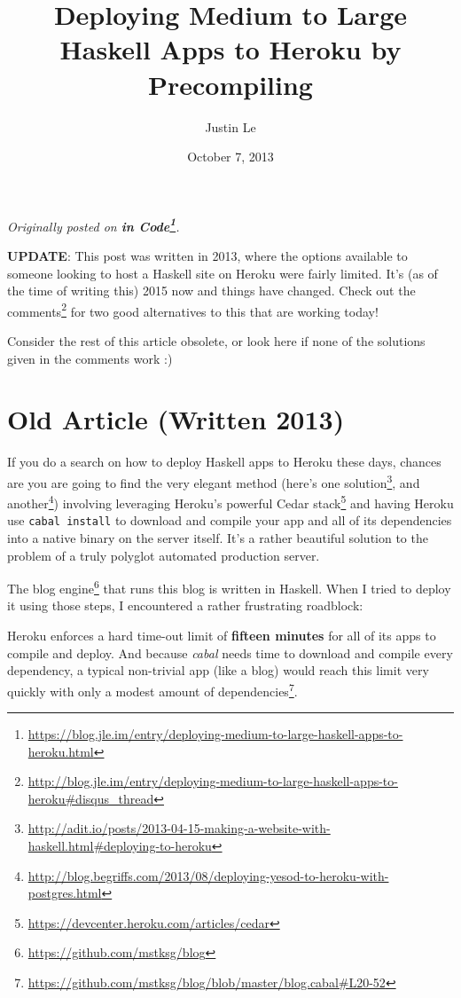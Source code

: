 \documentclass[]{article}
\title{Deploying Medium to Large Haskell Apps to Heroku by Precompiling}
\author{Justin Le}
\date{October 7, 2013}
\renewcommand{\href}[2]{#2\footnote{\url{#1}}}
\begin{document}
\maketitle

\emph{Originally posted on
\textbf{\href{https://blog.jle.im/entry/deploying-medium-to-large-haskell-apps-to-heroku.html}{in
Code}}.}

\textbf{UPDATE}: This post was written in 2013, where the options available to
someone looking to host a Haskell site on Heroku were fairly limited. It's (as
of the time of writing this) 2015 now and things have changed. Check out
\href{http://blog.jle.im/entry/deploying-medium-to-large-haskell-apps-to-heroku\#disqus_thread}{the
comments} for two good alternatives to this that are working today!

Consider the rest of this article obsolete, or look here if none of the
solutions given in the comments work :)

\section{Old Article (Written 2013)}\label{old-article-written-2013}

If you do a search on how to deploy Haskell apps to Heroku these days, chances
are you are going to find the very elegant method (here's
\href{http://adit.io/posts/2013-04-15-making-a-website-with-haskell.html\#deploying-to-heroku}{one
solution}, and
\href{http://blog.begriffs.com/2013/08/deploying-yesod-to-heroku-with-postgres.html}{another})
involving leveraging Heroku's powerful
\href{https://devcenter.heroku.com/articles/cedar}{Cedar stack} and having
Heroku use \texttt{cabal\ install} to download and compile your app and all of
its dependencies into a native binary on the server itself. It's a rather
beautiful solution to the problem of a truly polyglot automated production
server.

The \href{https://github.com/mstksg/blog}{blog engine} that runs this blog is
written in Haskell. When I tried to deploy it using those steps, I encountered a
rather frustrating roadblock:

Heroku enforces a hard time-out limit of \textbf{fifteen minutes} for all of its
apps to compile and deploy. And because \emph{cabal} needs time to download and
compile every dependency, a typical non-trivial app (like a blog) would reach
this limit very quickly with only a
\href{https://github.com/mstksg/blog/blob/master/blog.cabal\#L20-52}{modest
amount of dependencies}.
\end{document}
